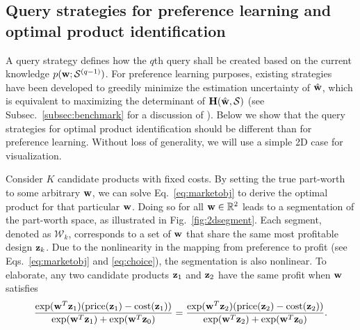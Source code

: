 \documentclass[onecolumn,11pt]{article}
\begin{document}
\subsection{Query strategies for preference learning and optimal product identification}
\label{sec:motivation}
A query strategy defines how the $q$th query shall be created based on the current knowledge $p({\bf w};\mathcal{S}^{(q-1)})$. For preference learning purposes, existing strategies~\cite{toubia2004polyhedral,toubia2003fast, toubia200712,abernethy2008eliciting} have been developed to greedily minimize the estimation uncertainty of $\hat{\bf w}$, which is equivalent to maximizing the determinant of ${\bf H}(\hat{\bf w},\mathcal{S})$ (see Subsec.~\ref{subsec:benchmark} for a discussion of \cite{abernethy2008eliciting}). Below we show that the query strategies for optimal product identification should be different than for preference learning. Without loss of generality, we will use a simple 2D case for visualization. 

Consider $K$ candidate products with fixed costs. By setting the true part-worth to some arbitrary ${\bf w}$, we can solve Eq.~\eqref{eq:marketobj} to derive the optimal product for that particular ${\bf w}$. Doing so for all ${\bf w} \in \mathbb{R}^2$ leads to a segmentation of the part-worth space, as illustrated in Fig.~\ref{fig:2dsegment}. Each segment, denoted as $\mathcal{W}_k$, corresponds to a set of ${\bf w}$ that share the same most profitable design ${\bf z}_k$. Due to the nonlinearity in the mapping from preference to profit (see Eqs.~\eqref{eq:marketobj} and \eqref{eq:choice}), the segmentation is also nonlinear. To elaborate, any two candidate products ${\bf z}_1$ and ${\bf z}_2$ have the same profit when ${\bf w}$ satisfies 
\begin{equation}
\frac{\exp({\bf w}^T{\bf z}_1)(\text{price}({\bf z}_1)-\text{cost}({\bf z}_1))}{\exp({\bf w}^T{\bf z}_1)+\exp({\bf w}^T{\bf z}_0)} = \frac{\exp({\bf w}^T{\bf z}_2)(\text{price}({\bf z}_2)-\text{cost}({\bf z}_2))}{\exp({\bf w}^T{\bf z}_2)+\exp({\bf w}^T{\bf z}_0)}.
\end{equation}
\end{document}

